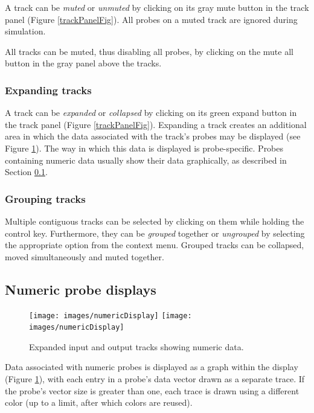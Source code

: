 \documentclass{article}
\begin{document}
A track can be {\it muted} or {\it unmuted} by clicking on its gray mute button
in the track panel (Figure \ref{trackPanelFig}). All probes on a muted track are
ignored during simulation.

All tracks can be muted, thus disabling all probes, by clicking
on the mute all button in the gray panel above the tracks.

\subsubsection{Expanding tracks}

A track can be {\it expanded} or {\it collapsed} by clicking on its green
expand button in the track panel (Figure \ref{trackPanelFig}). Expanding a track
creates an additional area in which the data associated with the
track's probes may be displayed (see Figure \ref{numericDisplayFig}). The way
in which this data is displayed is probe-specific. Probes containing
numeric data usually show their data graphically, as described in
Section \ref{numericProbeDisplaysSec}.

\subsubsection{Grouping tracks}

Multiple contiguous tracks can be selected by clicking on them while
holding the control key.  Furthermore, they can be {\it grouped} together
or {\it ungrouped} by selecting the appropriate option from the context
menu.  Grouped tracks can be collapsed, moved simultaneously and
muted together.

\subsection{Numeric probe displays}
\label{numericProbeDisplaysSec}

\begin{figure}[h]
\begin{center}
\iflatexml
\texttt{[image: images/numericDisplay]}
\else
\texttt{[image: images/numericDisplay]}
\fi
\end{center}
\caption{Expanded input and output tracks showing numeric data.}%
\label{numericDisplayFig}
\end{figure}

Data associated with numeric probes is displayed as a graph within the
display (Figure \ref{numericDisplayFig}), with each entry in a probe's
data vector drawn as a separate trace.  If the probe's vector size is
greater than one, each trace is drawn using a different color (up to a
limit, after which colors are reused).
\end{document}
